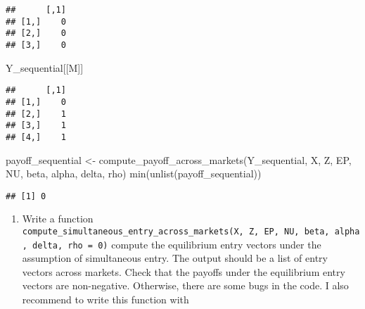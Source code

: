 \documentclass[
]{article}
\newenvironment{Shaded}{\begin{snugshade}}{\end{snugshade}}
\newcommand{\FunctionTok}[1]{\textcolor[rgb]{0.00,0.00,0.00}{#1}}
\newcommand{\NormalTok}[1]{#1}
\newcommand{\OtherTok}[1]{\textcolor[rgb]{0.56,0.35,0.01}{#1}}
\providecommand{\tightlist}{%
  \setlength{\itemsep}{0pt}\setlength{\parskip}{0pt}}
\begin{document}
\begin{verbatim}
##      [,1]
## [1,]    0
## [2,]    0
## [3,]    0
\end{verbatim}

\begin{Shaded}
\begin{Highlighting}[]
\NormalTok{Y\_sequential[[M]]}
\end{Highlighting}
\end{Shaded}

\begin{verbatim}
##      [,1]
## [1,]    0
## [2,]    1
## [3,]    1
## [4,]    1
\end{verbatim}

\begin{Shaded}
\begin{Highlighting}[]
\NormalTok{payoff\_sequential }\OtherTok{\textless{}{-}}
  \FunctionTok{compute\_payoff\_across\_markets}\NormalTok{(Y\_sequential, X, Z, EP, NU, beta, alpha, delta, rho)}
\FunctionTok{min}\NormalTok{(}\FunctionTok{unlist}\NormalTok{(payoff\_sequential))}
\end{Highlighting}
\end{Shaded}

\begin{verbatim}
## [1] 0
\end{verbatim}

\begin{enumerate}
\def\labelenumi{\arabic{enumi}.}
\setcounter{enumi}{7}
\tightlist
\item
  Write a function
  \texttt{compute\_simultaneous\_entry\_across\_markets(X,\ Z,\ EP,\ NU,\ beta,\ alpha,\ delta,\ rho\ =\ 0)}
  compute the equilibrium entry vectors under the assumption of
  simultaneous entry. The output should be a list of entry vectors
  across markets. Check that the payoffs under the equilibrium entry
  vectors are non-negative. Otherwise, there are some bugs in the code.
  I also recommend to write this function with
\end{enumerate}
\end{document}
